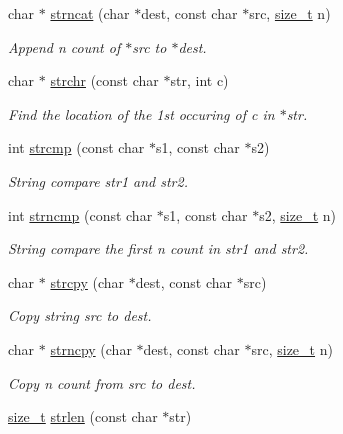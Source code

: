 \begin{DoxyCompactItemize}
char $\ast$ \mbox{\hyperlink{a00128_a0aee928c2844a269966e4832fd2255c5}{strncat}} (char $\ast$dest, const char $\ast$src, \mbox{\hyperlink{a00131_a43b4547e12226fef871eed8afe191ad7}{size\+\_\+t}} n)
\begin{DoxyCompactList}\small\item\em Append n count of $\ast$src to $\ast$dest. \end{DoxyCompactList}\item 
char $\ast$ \mbox{\hyperlink{a00128_afcd97f487174f9092b0f23c7ac78a55a}{strchr}} (const char $\ast$str, int c)
\begin{DoxyCompactList}\small\item\em Find the location of the 1st occuring of c in $\ast$str. \end{DoxyCompactList}\item 
int \mbox{\hyperlink{a00128_a11bd144d7d44914099a3aeddf1c8567d}{strcmp}} (const char $\ast$s1, const char $\ast$s2)
\begin{DoxyCompactList}\small\item\em String compare str1 and str2. \end{DoxyCompactList}\item 
int \mbox{\hyperlink{a00128_a07f4a84c11c106e95c32b6ab509346ef}{strncmp}} (const char $\ast$s1, const char $\ast$s2, \mbox{\hyperlink{a00131_a43b4547e12226fef871eed8afe191ad7}{size\+\_\+t}} n)
\begin{DoxyCompactList}\small\item\em String compare the first n count in str1 and str2. \end{DoxyCompactList}\item 
char $\ast$ \mbox{\hyperlink{a00128_a7a82515b5d377be04817715c5465b647}{strcpy}} (char $\ast$dest, const char $\ast$src)
\begin{DoxyCompactList}\small\item\em Copy string src to dest. \end{DoxyCompactList}\item 
char $\ast$ \mbox{\hyperlink{a00128_a47d54f24198df56da51078a6c540b9ed}{strncpy}} (char $\ast$dest, const char $\ast$src, \mbox{\hyperlink{a00131_a43b4547e12226fef871eed8afe191ad7}{size\+\_\+t}} n)
\begin{DoxyCompactList}\small\item\em Copy n count from src to dest. \end{DoxyCompactList}\item 
\mbox{\hyperlink{a00131_a43b4547e12226fef871eed8afe191ad7}{size\+\_\+t}} \mbox{\hyperlink{a00128_a008e171a518fe0e0352f31b245e03875}{strlen}} (const char $\ast$str)

\end{DoxyCompactItemize}
